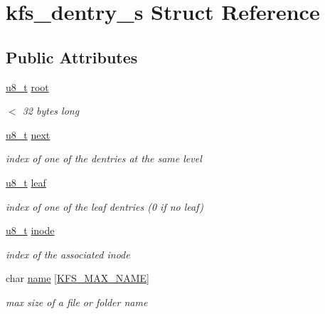 \hypertarget{structkfs__dentry__s}{\section{kfs\-\_\-dentry\-\_\-s Struct Reference}
\label{structkfs__dentry__s}
}
\subsection*{Public Attributes}
\begin{DoxyCompactItemize}
\item 
\hyperlink{kfs_8c_ae081489b4906f65a3cb18e9fbe9f8d23}{u8\-\_\-t} \hyperlink{structkfs__dentry__s_aed21f3f5ab2de70ab3416afe6dd9e4d4}{root}
\begin{DoxyCompactList}\small\item\em $<$ 32 bytes long \end{DoxyCompactList}\item 
\hyperlink{kfs_8c_ae081489b4906f65a3cb18e9fbe9f8d23}{u8\-\_\-t} \hyperlink{structkfs__dentry__s_a17c6495def8c6564de45ab64cbc49066}{next}
\begin{DoxyCompactList}\small\item\em index of one of the dentries at the same level \end{DoxyCompactList}\item 
\hyperlink{kfs_8c_ae081489b4906f65a3cb18e9fbe9f8d23}{u8\-\_\-t} \hyperlink{structkfs__dentry__s_a79fd3c8764d633fdb895b77856f61d61}{leaf}
\begin{DoxyCompactList}\small\item\em index of one of the leaf dentries (0 if no leaf) \end{DoxyCompactList}\item 
\hyperlink{kfs_8c_ae081489b4906f65a3cb18e9fbe9f8d23}{u8\-\_\-t} \hyperlink{structkfs__dentry__s_a4e87e5375dfccc972eae6a05bfa2a086}{inode}
\begin{DoxyCompactList}\small\item\em index of the associated inode \end{DoxyCompactList}\item 
char \hyperlink{structkfs__dentry__s_a9e5a536f0b9b95dc094c58c66c61ddcc}{name} \mbox{[}\hyperlink{kfs_8c_ae0b389bdf68187ccb1610271d36edb33}{K\-F\-S\-\_\-\-M\-A\-X\-\_\-\-N\-A\-M\-E}\mbox{]}
\begin{DoxyCompactList}\small\item\em max size of a file or folder name \end{DoxyCompactList}\end{DoxyCompactItemize}


